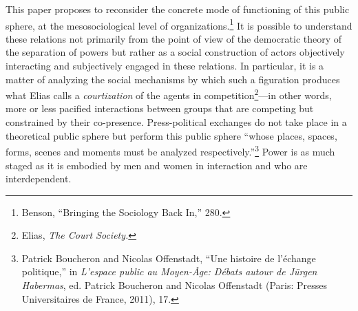 \documentclass{tufte-handout}
\begin{document}
This paper proposes to reconsider the concrete mode of functioning of
this public sphere, at the mesosociological level of
organizations.\footnote{Benson, ``Bringing the Sociology Back In,'' 280.}
It is possible to understand these relations not primarily from the
point of view of the democratic theory of the separation of powers but
rather as a social construction of actors objectively interacting and
subjectively engaged in these relations. In particular, it is a matter
of analyzing the social mechanisms by which such a figuration produces
what Elias calls a \emph{courtization} of the agents in
competition\footnote{Elias, \emph{The Court Society.}}---in other words,
more or less pacified interactions between groups that are competing but
constrained by their co-presence. Press-political exchanges do not take
place in a theoretical public sphere but perform this public sphere
``whose places, spaces, forms, scenes and moments must be analyzed
respectively.''\footnote{Patrick Boucheron and Nicolas Offenstadt, ``Une
  histoire de l'échange politique,'' in \emph{L'espace public au
  Moyen-Âge: Débats autour de Jürgen Habermas}, ed. Patrick Boucheron
  and Nicolas Offenstadt (Paris: Presses Universitaires de France,
  2011), 17.} Power is as much staged as it is embodied by men and women
in interaction and who are interdependent.
\end{document}
